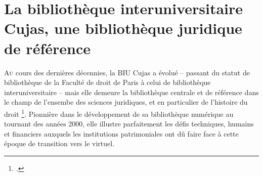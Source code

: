 \chapter[BIU Cujas]{La bibliothèque interuniversitaire Cujas, une bibliothèque juridique de référence}

\lettrine{A}u cours des dernières décennies, la \ac{BIU Cujas} a évolué -- passant du statut de bibliothèque de la Faculté de droit de Paris à celui de bibliothèque interuniversitaire -- mais elle demeure la bibliothèque centrale et de référence dans le champ de l'ensembe des sciences juridiques, et en particulier de l'histoire du droit \footcite{lobetCujasTraditionModernite2002}. Pionnière dans le développement de sa bibliothèque numérique au tournant des années 2000, elle illustre parfaitement les défis techniques, humains et financiers auxquels les institutions patrimoniales ont dû faire face à cette époque de transition vers le virtuel.





